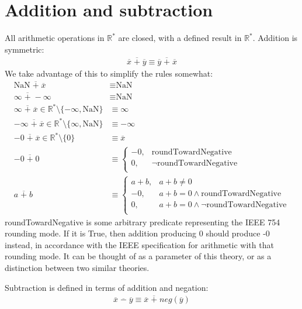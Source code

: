 \documentclass[letterpaper,10pt]{article}
\newcommand{\NaN}{\text{NaN}}
\begin{document}
\section{Addition and subtraction}

 All arithmetic operations in $\mathbb{R}^*$ are closed, with a defined result in $\mathbb{R}^*$. Addition is symmetric:
\begin{align}
 \overline{x} \;\overline{+}\; \overline{y} \equiv \overline{y} \;\overline{+}\; \overline{x}
\end{align}
 We take advantage of this to simplify the rules somewhat:
\begin{align}
 \NaN \;\overline{+}\; \overline{x} &\equiv \NaN \\
 \infty \;\overline{+}\; -\infty &\equiv \NaN \\
 \infty \;\overline{+}\; \overline{x} \in \mathbb{R}^* \setminus \{-\infty, \NaN\} &\equiv \infty \\
 -\infty \;\overline{+}\; \overline{x} \in \mathbb{R}^* \setminus \{\infty, \NaN\} &\equiv -\infty \\
 -0 \;\overline{+}\; \overline{x} \in \mathbb{R}^* \setminus \{0\} &\equiv \overline{x} \\
 -0 \;\overline{+}\; 0 &\equiv
 \begin{cases}
  -0, &\text{roundTowardNegative} \\
  0,  &\lnot \text{roundTowardNegative} \\
 \end{cases}\\
 a \;\overline{+}\; b &\equiv
 \begin{cases}
  a + b, &a + b \not= 0 \\
  -0,    &a + b = 0 \land \text{roundTowardNegative} \\
  0,     &a + b = 0 \land \lnot \text{roundTowardNegative} \\
 \end{cases}
\end{align}
 roundTowardNegative is some arbitrary predicate representing the IEEE 754 rounding mode. If it is True, then addition producing 0 should produce -0 instead, in accordance with the IEEE specification for arithmetic with that rounding mode. It can be thought of as a parameter of this theory, or as a distinction between two similar theories.

 Subtraction is defined in terms of addition and negation:
\begin{align}
 \overline{x} \;\overline{-}\; \overline{y} \equiv \overline{x} \;\overline{+}\; neg(\overline{y})
\end{align}
\end{document}

